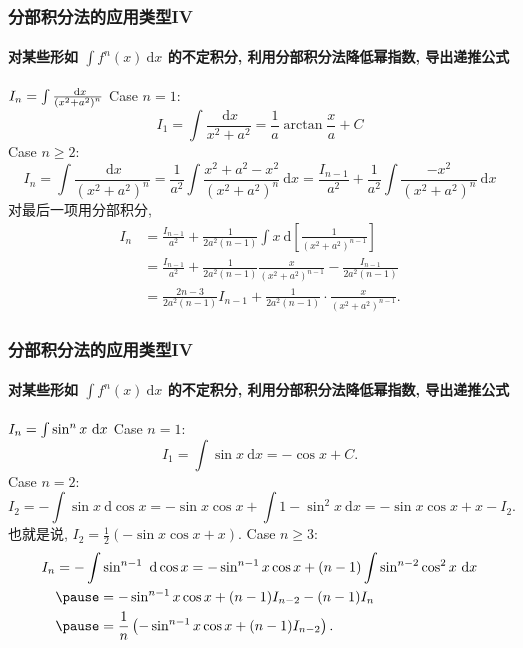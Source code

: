\documentclass[
10pt,
aspectratio=43,
]{beamer}
\begin{document}
\begin{frame}
	\frametitle{分部积分法的应用类型IV}
	\framesubtitle{对某些形如 $\int f^n(x) \mathrm{~d} x$ 的不定积分, 利用分部积分法降低幂指数, 导出递推公式}
	\everymath{\displaystyle}
	{\small
		\begin{exampleblock}{$\color{black}I_n=\int \frac{\mathrm{~d} x}{\left(x^2+a^2\right)^n}$}
			\pause Case $n=1$:\pause 
			$$
				I_1=\int \frac{\mathrm{~d} x}{x^2+a^2}=\frac{1}{a} \arctan \frac{x}{a}+C
			$$
			\pause Case $n\ge2$:\pause 
			$$
				I_n=\int \frac{\mathrm{~d} x}{\left(x^2+a^2\right)^n}=\frac{1}{a^2} \int \frac{x^2+a^2-x^2}{\left(x^2+a^2\right)^n} \mathrm{~d} x=\frac{I_{n-1}}{a^2}+\frac{1}{a^2} \int \frac{-x^2}{\left(x^2+a^2\right)^n} \mathrm{~d} x
			$$
			\pause 对最后一项用分部积分,\pause 
			$$
				\begin{aligned}
					I_n & =\frac{I_{n-1}}{a^2}+\frac{1}{2 a^2(n-1)} \int x \mathrm{~d}\left[\frac{1}{\left(x^2+a^2\right)^{n-1}}\right] \\
					    & =\frac{I_{n-1}}{a^2}+\frac{1}{2 a^2(n-1)} \frac{x}{\left(x^2+a^2\right)^{n-1}}-\frac{I_{n-1}}{2 a^2(n-1)}     \\
					    & =\frac{2 n-3}{2 a^2(n-1)} I_{n-1}+\frac{1}{2 a^2(n-1)} \cdot \frac{x}{\left(x^2+a^2\right)^{n-1}}.
				\end{aligned}
			$$
		\end{exampleblock}
	}
\end{frame}

\begin{frame}
	\frametitle{分部积分法的应用类型IV}
	\framesubtitle{对某些形如 $\int f^n(x) \mathrm{~d} x$ 的不定积分, 利用分部积分法降低幂指数, 导出递推公式}
	\everymath{\displaystyle}
	{\small
		\begin{exampleblock}{$\color{black}I_n=\int \sin^n x\mathrm{~d} x$}
			\pause Case $n=1$:\pause 
			$$
				I_1=\int \sin x\mathrm{~d}x = -\cos x+C.
			$$
			\pause Case $n=2$:\pause 
			$$
				I_2=-\int\sin x\mathrm{~d}\cos x =-\sin x\cos x+ \int 1-\sin^2x\mathrm{~d}x=-\sin x\cos x+x -I_2.
			$$
			\pause 也就是说, $I_2=\frac{1}{2}\left(-\sin x\cos x +x\right)$. \pause Case $n\ge3$:\pause 
			$$
				\begin{aligned}
					I_n & =-\int\sin ^{n-1}\mathrm{~d}\cos x  =-\sin^{n-1}x\cos x+(n-1)\int \sin^{n-2}\cos^2x\mathrm{~d}x \\
					    & \pause =-\sin^{n-1}x\cos x+(n-1)I_{n-2}-(n-1)I_{n}                                                     \\
					    & \pause =\frac{1}{n}\left(-\sin^{n-1}x\cos x +(n-1)I_{n-2}\right).
				\end{aligned}
			$$
		\end{exampleblock}
	}
\end{frame}
\end{document}
